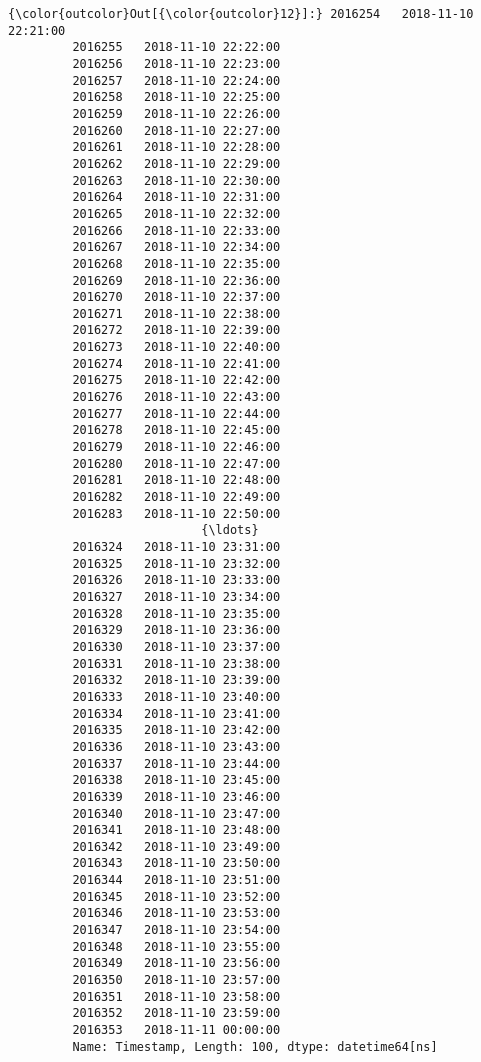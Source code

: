 \documentclass[11pt]{article}
\begin{document}
\begin{Verbatim}[commandchars=\\\{\}]
{\color{outcolor}Out[{\color{outcolor}12}]:} 2016254   2018-11-10 22:21:00
         2016255   2018-11-10 22:22:00
         2016256   2018-11-10 22:23:00
         2016257   2018-11-10 22:24:00
         2016258   2018-11-10 22:25:00
         2016259   2018-11-10 22:26:00
         2016260   2018-11-10 22:27:00
         2016261   2018-11-10 22:28:00
         2016262   2018-11-10 22:29:00
         2016263   2018-11-10 22:30:00
         2016264   2018-11-10 22:31:00
         2016265   2018-11-10 22:32:00
         2016266   2018-11-10 22:33:00
         2016267   2018-11-10 22:34:00
         2016268   2018-11-10 22:35:00
         2016269   2018-11-10 22:36:00
         2016270   2018-11-10 22:37:00
         2016271   2018-11-10 22:38:00
         2016272   2018-11-10 22:39:00
         2016273   2018-11-10 22:40:00
         2016274   2018-11-10 22:41:00
         2016275   2018-11-10 22:42:00
         2016276   2018-11-10 22:43:00
         2016277   2018-11-10 22:44:00
         2016278   2018-11-10 22:45:00
         2016279   2018-11-10 22:46:00
         2016280   2018-11-10 22:47:00
         2016281   2018-11-10 22:48:00
         2016282   2018-11-10 22:49:00
         2016283   2018-11-10 22:50:00
                           {\ldots}        
         2016324   2018-11-10 23:31:00
         2016325   2018-11-10 23:32:00
         2016326   2018-11-10 23:33:00
         2016327   2018-11-10 23:34:00
         2016328   2018-11-10 23:35:00
         2016329   2018-11-10 23:36:00
         2016330   2018-11-10 23:37:00
         2016331   2018-11-10 23:38:00
         2016332   2018-11-10 23:39:00
         2016333   2018-11-10 23:40:00
         2016334   2018-11-10 23:41:00
         2016335   2018-11-10 23:42:00
         2016336   2018-11-10 23:43:00
         2016337   2018-11-10 23:44:00
         2016338   2018-11-10 23:45:00
         2016339   2018-11-10 23:46:00
         2016340   2018-11-10 23:47:00
         2016341   2018-11-10 23:48:00
         2016342   2018-11-10 23:49:00
         2016343   2018-11-10 23:50:00
         2016344   2018-11-10 23:51:00
         2016345   2018-11-10 23:52:00
         2016346   2018-11-10 23:53:00
         2016347   2018-11-10 23:54:00
         2016348   2018-11-10 23:55:00
         2016349   2018-11-10 23:56:00
         2016350   2018-11-10 23:57:00
         2016351   2018-11-10 23:58:00
         2016352   2018-11-10 23:59:00
         2016353   2018-11-11 00:00:00
         Name: Timestamp, Length: 100, dtype: datetime64[ns]
\end{Verbatim}
            
\end{document}
